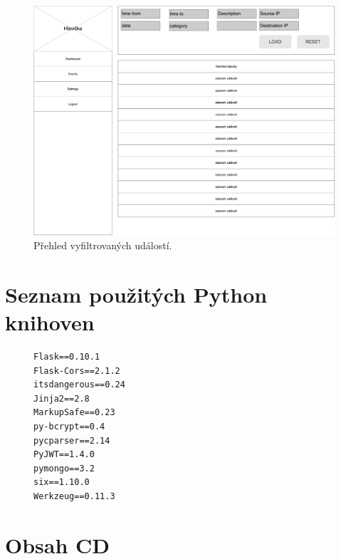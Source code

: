 \begin{figure}[ht]
    \centering
    \includegraphics[width=1\textwidth]{fig/wf_dashboard_events.pdf}
    \caption{Přehled vyfiltrovaných událostí.} \label{wf:dashboard_events}
\end{figure}

\chapter{Seznam použitých Python knihoven}

\begin{figure}[ht]
\lstset{basicstyle=\small,style=JSON}
\begin{lstlisting}
Flask==0.10.1
Flask-Cors==2.1.2
itsdangerous==0.24
Jinja2==2.8
MarkupSafe==0.23
py-bcrypt==0.4
pycparser==2.14
PyJWT==1.4.0
pymongo==3.2
six==1.10.0
Werkzeug==0.11.3
\end{lstlisting}
\label{code:requirements}
\end{figure}



\chapter{Obsah CD}

